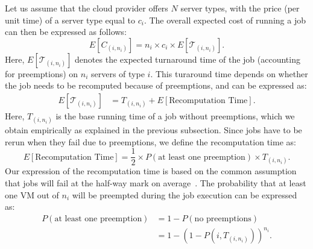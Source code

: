 

Let us assume that the cloud provider offers $N$ server types, with the price (per unit time) of a server type equal to $c_i$. 
The overall expected cost of running a job can then be expressed as follows:
\begin{equation}
  \label{eq:e-cost}
  E[C_{( i,n_i )}] = n_i\times c_i \times E[\mathcal{T}_{( i,n_i )}].
\end{equation}
Here, $E[\mathcal{T}_{( i,n_i )}]$ denotes the expected turnaround time of the job (accounting for preemptions) on $n_i$ servers of type $i$.
%
This turaround time depends on whether the job needs to be recomputed because of preemptions, and can be expressed as:
\begin{align}
  \label{eq:turnaround}
  E[\mathcal{T}_{( i,n_i )}] &= T_{( i,n_i )} + E[\text{Recomputation Time}].
\end{align}
Here, $T_{( i,n_i )}$ is the base running time of a job without preemptions, which we obtain empirically as explained in the previous subsection.
Since jobs have to be rerun when they fail due to preemptions, we define the recomputation time as:
\begin{equation}
  \label{eq:recomput}
   E[\text{Recomputation Time}] = \frac{1}{2} \times P(\text{at least one preemption}) \times T_{( i,n_i )}.   
 \end{equation}
 Our expression of the recomputation time is based on the common assumption that jobs will fail at the half-way mark on average~\cite{daly2006higher, bougeret_checkpointing_2011}. 
%
The probability that at least one VM out of $n_i$ will be preempted during the job execution can be expressed as:
\begin{align}
  \label{eq:pfail1}
  P(\text{at least one preemption}) &= 1-P(\text{no preemptions}) \\
                                 &= 1-\left(1-P\left(i,T_{(i, n_i)}\right)\right)^{n_i}.
\end{align}


